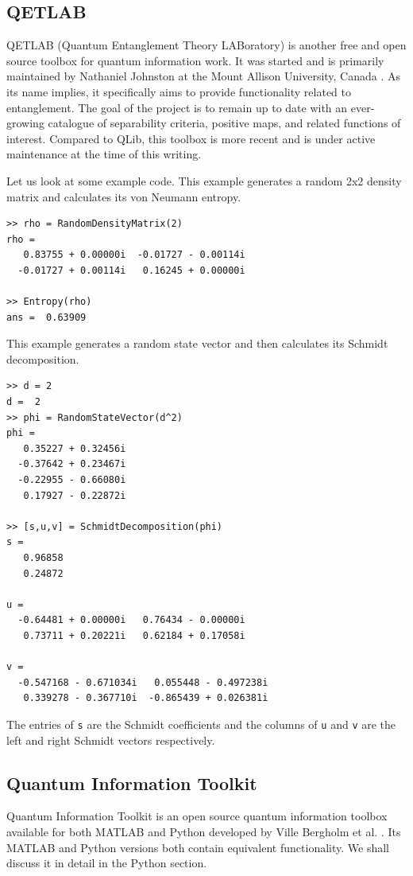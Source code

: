 \subsection{QETLAB}
QETLAB (Quantum Entanglement Theory LABoratory) is another free and open source toolbox for quantum information work. It was started and is primarily maintained by Nathaniel Johnston at the Mount Allison University, Canada \cite{qetlab}. As its name implies, it specifically aims to provide functionality related to entanglement. The goal of the project is to remain up to date with an ever-growing catalogue of separability criteria, positive maps, and related functions of interest. Compared to QLib, this toolbox is more recent and is under active maintenance at the time of this writing.
\par Let us look at some example code. This example generates a random 2x2 density matrix and calculates its von Neumann entropy.
\begin{verbatim}
>> rho = RandomDensityMatrix(2)
rho =
   0.83755 + 0.00000i  -0.01727 - 0.00114i
  -0.01727 + 0.00114i   0.16245 + 0.00000i

>> Entropy(rho)
ans =  0.63909
\end{verbatim}

This example generates a random state vector and then calculates its Schmidt decomposition.
\begin{verbatim}
>> d = 2
d =  2
>> phi = RandomStateVector(d^2)
phi =
   0.35227 + 0.32456i
  -0.37642 + 0.23467i
  -0.22955 - 0.66080i
   0.17927 - 0.22872i

>> [s,u,v] = SchmidtDecomposition(phi)
s =
   0.96858
   0.24872

u =
  -0.64481 + 0.00000i   0.76434 - 0.00000i
   0.73711 + 0.20221i   0.62184 + 0.17058i

v =
  -0.547168 - 0.671034i   0.055448 - 0.497238i
   0.339278 - 0.367710i  -0.865439 + 0.026381i

\end{verbatim}
The entries of \texttt{s} are the Schmidt coefficients and the columns of \texttt{u} and \texttt{v} are the left and right Schmidt vectors respectively.

\subsection{Quantum Information Toolkit}
Quantum Information Toolkit is an open source quantum information toolbox available for both MATLAB and Python developed by Ville Bergholm et al. \cite{quantuminformationtoolkit}. Its MATLAB and Python versions both contain equivalent functionality. We shall discuss it in detail in the Python section.

